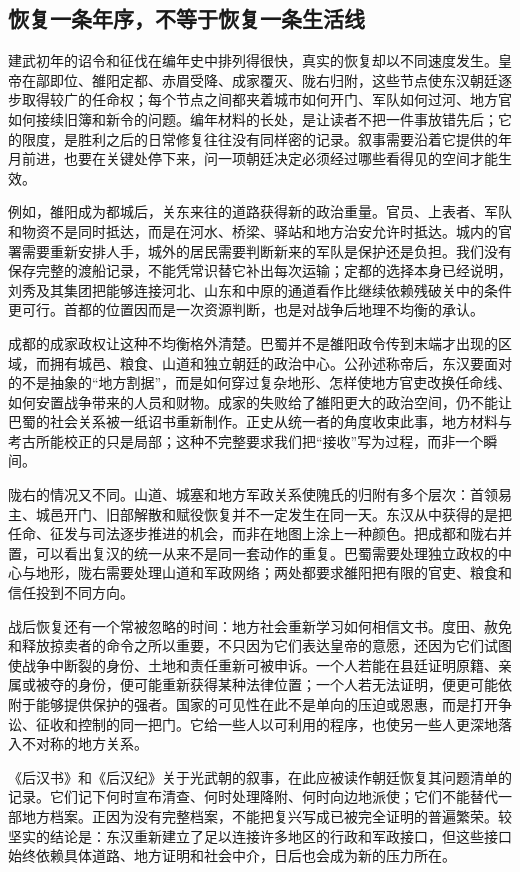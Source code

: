 \subsection{恢复一条年序，不等于恢复一条生活线}

建武初年的诏令和征伐在编年史中排列得很快，真实的恢复却以不同速度发生。皇帝在鄗即位、雒阳定都、赤眉受降、成家覆灭、陇右归附，这些节点使东汉朝廷逐步取得较广的任命权；每个节点之间都夹着城市如何开门、军队如何过河、地方官如何接续旧簿和新令的问题。编年材料的长处，是让读者不把一件事放错先后；它的限度，是胜利之后的日常修复往往没有同样密的记录。叙事需要沿着它提供的年月前进，也要在关键处停下来，问一项朝廷决定必须经过哪些看得见的空间才能生效。

例如，雒阳成为都城后，关东来往的道路获得新的政治重量。官员、上表者、军队和物资不是同时抵达，而是在河水、桥梁、驿站和地方治安允许时抵达。城内的官署需要重新安排人手，城外的居民需要判断新来的军队是保护还是负担。我们没有保存完整的渡船记录，不能凭常识替它补出每次运输；定都的选择本身已经说明，刘秀及其集团把能够连接河北、山东和中原的通道看作比继续依赖残破关中的条件更可行。首都的位置因而是一次资源判断，也是对战争后地理不均衡的承认。

成都的成家政权让这种不均衡格外清楚。巴蜀并不是雒阳政令传到末端才出现的区域，而拥有城邑、粮食、山道和独立朝廷的政治中心。公孙述称帝后，东汉要面对的不是抽象的“地方割据”，而是如何穿过复杂地形、怎样使地方官吏改换任命线、如何安置战争带来的人员和财物。成家的失败给了雒阳更大的政治空间，仍不能让巴蜀的社会关系被一纸诏书重新制作。正史从统一者的角度收束此事，地方材料与考古所能校正的只是局部；这种不完整要求我们把“接收”写为过程，而非一个瞬间。

陇右的情况又不同。山道、城塞和地方军政关系使隗氏的归附有多个层次：首领易主、城邑开门、旧部解散和赋役恢复并不一定发生在同一天。东汉从中获得的是把任命、征发与司法逐步推进的机会，而非在地图上涂上一种颜色。把成都和陇右并置，可以看出复汉的统一从来不是同一套动作的重复。巴蜀需要处理独立政权的中心与地形，陇右需要处理山道和军政网络；两处都要求雒阳把有限的官吏、粮食和信任投到不同方向。

战后恢复还有一个常被忽略的时间：地方社会重新学习如何相信文书。度田、赦免和释放掠卖者的命令之所以重要，不只因为它们表达皇帝的意愿，还因为它们试图使战争中断裂的身份、土地和责任重新可被申诉。一个人若能在县廷证明原籍、亲属或被夺的身份，便可能重新获得某种法律位置；一个人若无法证明，便更可能依附于能够提供保护的强者。国家的可见性在此不是单向的压迫或恩惠，而是打开争讼、征收和控制的同一把门。它给一些人以可利用的程序，也使另一些人更深地落入不对称的地方关系。

《后汉书》和《后汉纪》关于光武朝的叙事，在此应被读作朝廷恢复其问题清单的记录。它们记下何时宣布清查、何时处理降附、何时向边地派使；它们不能替代一部地方档案。正因为没有完整档案，不能把复兴写成已被完全证明的普遍繁荣。较坚实的结论是：东汉重新建立了足以连接许多地区的行政和军政接口，但这些接口始终依赖具体道路、地方证明和社会中介，日后也会成为新的压力所在。

